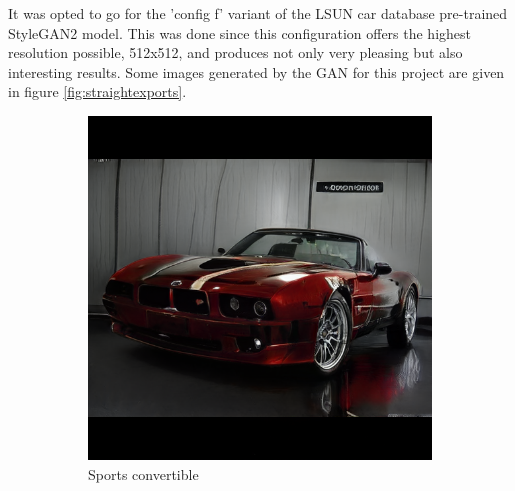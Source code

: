 It was opted to go for the 'config f' variant of the LSUN car database pre-trained StyleGAN2 model.
This was done since this configuration offers the highest resolution possible, 512x512, and produces not only very pleasing but also interesting results.
Some images generated by the GAN for this project are given in figure \ref{fig:straightexports}.

\begin{figure}
\centering
\begin{subfigure}{.3\textwidth}
  \centering
  \includegraphics[width=\textwidth]{images/Attempt at reflection.png}
  \caption{Sports convertible}
  \label{fig:reflection}
\end{subfigure}%
\hspace{.02\textwidth}
\begin{subfigure}{.3\textwidth}
  \centering

\end{subfigure}
\end{figure}
